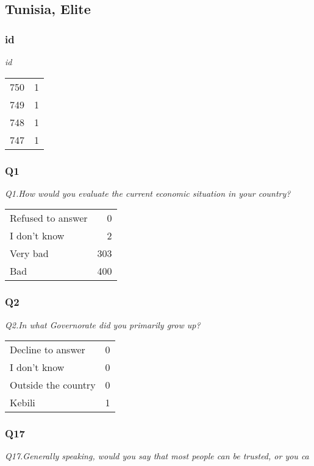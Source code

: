 \documentclass[
]{article}
\begin{document}
\hypertarget{tunisia-elite}{%
\subsection{Tunisia, Elite}\label{tunisia-elite}}

\hypertarget{id-2}{%
\subsubsection{id}\label{id-2}}

\textit{id}

\begin{longtable}[]{@{}lr@{}}
\toprule
\endhead
750 & 1\tabularnewline
749 & 1\tabularnewline
748 & 1\tabularnewline
747 & 1\tabularnewline
\bottomrule
\end{longtable}

\hypertarget{q1-3}{%
\subsubsection{Q1}\label{q1-3}}

\textit{Q1.How would you evaluate the current economic situation in your country?}

\begin{longtable}[]{@{}lr@{}}
\toprule
\endhead
Refused to answer & 0\tabularnewline
I don't know & 2\tabularnewline
Very bad & 303\tabularnewline
Bad & 400\tabularnewline
\bottomrule
\end{longtable}

\hypertarget{q2-3}{%
\subsubsection{Q2}\label{q2-3}}

\textit{Q2.In what Governorate did you primarily grow up?}

\begin{longtable}[]{@{}lr@{}}
\toprule
\endhead
Decline to answer & 0\tabularnewline
I don't know & 0\tabularnewline
Outside the country & 0\tabularnewline
Kebili & 1\tabularnewline
\bottomrule
\end{longtable}

\hypertarget{q17-1}{%
\subsubsection{Q17}\label{q17-1}}

\textit{Q17.Generally speaking, would you say that most people can be trusted, or you ca}
\end{document}
